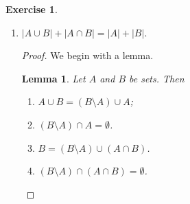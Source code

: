 \documentclass[titlepage]{article}
\newcounter{script}
\newtheorem*{lemma*}{Lemma}
\theoremstyle{definition}
\newtheorem{exercise}{Exercise}[script]
\begin{document}
\begin{exercise}
\begin{enumerate}[label={\alph*)}]
\begin{proof}
            At this point, Definition 1.20 implies that $f$ is bijective, meaning by Definition 1.28 and 1.33 that $|A\cup B|=m+n=|A|+|B|$, as desired.
        \end{proof}
        \item $|A\cup B|+|A\cap B|=|A|+|B|$.
        \begin{proof}
            We begin with a lemma.
            \begin{lemma*}
                Let $A$ and $B$ be sets. Then
                \begin{enumerate}[label={\alph*\textup{)}}]
                    \item $A\cup B=(B\setminus A)\cup A$;
                    \item $(B\setminus A)\cap A=\emptyset$.
                    \item $B=(B\setminus A)\cup(A\cap B)$.
                    \item $(B\setminus A)\cap(A\cap B)=\emptyset$.
                \end{enumerate}
                \begin{center}
\end{center}
\end{lemma*}
\end{proof}
\end{enumerate}
\end{exercise}
\end{document}
